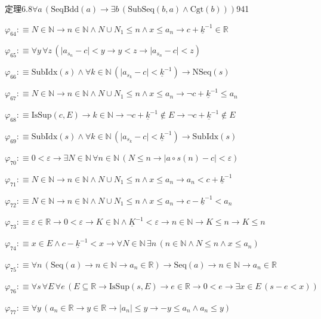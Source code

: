 \begin{fullproof}{定理6.8}{$\forall a\,(\mathrm{SeqBdd}(a) \to \exists b\,(\mathrm{SubSeq}(b,a) \land \mathrm{Cgt}(b)))$}{941}
\begin{abbrevlist}
\item $\varphi_{64} :\equiv N \in \mathbb{N} \to n \in \mathbb{N} \land N \cup N_{1} \leq n \land x \leq a_{n} \to c + \underline{k}^{-1} \in \mathbb{R}$
\item $\varphi_{65} :\equiv \forall y\,\forall z\,(\lvert a_{s_{n}} - c \rvert < y \to y < z \to \lvert a_{s_{n}} - c \rvert < z)$
\item $\varphi_{66} :\equiv \mathrm{SubIdx}(s) \land \forall k \in \mathbb{N}\,(\lvert a_{s_{k}} - c \rvert < \underline{k}^{-1}) \to \mathrm{NSeq}(s)$
\item $\varphi_{67} :\equiv N \in \mathbb{N} \to n \in \mathbb{N} \land N \cup N_{1} \leq n \land x \leq a_{n} \to \neg c + \underline{k}^{-1} \leq a_{n}$
\item $\varphi_{68} :\equiv \mathrm{IsSup}(c,E) \to k \in \mathbb{N} \to \neg c + \underline{k}^{-1} \notin E \to \neg c + \underline{k}^{-1} \notin E$
\item $\varphi_{69} :\equiv \mathrm{SubIdx}(s) \land \forall k \in \mathbb{N}\,(\lvert a_{s_{k}} - c \rvert < \underline{k}^{-1}) \to \mathrm{SubIdx}(s)$
\item $\varphi_{70} :\equiv 0 < \varepsilon \to \exists N \in \mathbb{N}\,\forall n \in \mathbb{N}\,(N \leq n \to \lvert a \circ s(n) - c \rvert < \varepsilon)$
\item $\varphi_{71} :\equiv N \in \mathbb{N} \to n \in \mathbb{N} \land N \cup N_{1} \leq n \land x \leq a_{n} \to a_{n} < c + \underline{k}^{-1}$
\item $\varphi_{72} :\equiv N \in \mathbb{N} \to n \in \mathbb{N} \land N \cup N_{1} \leq n \land x \leq a_{n} \to c - \underline{k}^{-1} < a_{n}$
\item $\varphi_{73} :\equiv \varepsilon \in \mathbb{R} \to 0 < \varepsilon \to K \in \mathbb{N} \land \underline{K}^{-1} < \varepsilon \to n \in \mathbb{N} \to K \leq n \to K \leq n$
\item $\varphi_{74} :\equiv x \in E \land c - \underline{k}^{-1} < x \to \forall N \in \mathbb{N}\,\exists n\,(n \in \mathbb{N} \land N \leq n \land x \leq a_{n})$
\item $\varphi_{75} :\equiv \forall n\,(\mathrm{Seq}(a) \to n \in \mathbb{N} \to a_{n} \in \mathbb{R}) \to \mathrm{Seq}(a) \to n \in \mathbb{N} \to a_{n} \in \mathbb{R}$
\item $\varphi_{76} :\equiv \forall s\,\forall E\,\forall e\,(E \subseteq \mathbb{R} \to \mathrm{IsSup}(s,E) \to e \in \mathbb{R} \to 0 < e \to \exists x \in E\,(s - e < x))$
\item $\varphi_{77} :\equiv \forall y\,(a_{n} \in \mathbb{R} \to y \in \mathbb{R} \to \lvert a_{n} \rvert \leq y \to -y \leq a_{n} \land a_{n} \leq y)$

\end{abbrevlist}
\end{fullproof}
